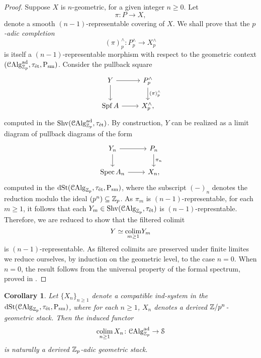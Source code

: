 \documentclass[10pt,a4paper]{amsart}
\numberwithin{equation}{subsection}
\newtheorem{corollary}[theorem]{Corollary}
\theoremstyle{definition}
\begin{document}
\begin{proof} Suppose $X$ is $n$-geometric, for a given integer $n \geq 0$. Let
        \[
                \pi \colon P \to X  ,
        \]
    denote a smooth $(n-1)$-representable covering of $X$. We shall prove that the \emph{$p$-adic completion}
    \[
            (\pi)^\wedge_p \colon P^\wedge_p \to X^\wedge_p    
    \] 
    is itself a $(n-1)$-representable morphism with respect to the geometric context $(\mathcal C \mathrm{Alg}^{\mathrm{ad}}_{\mathbb Z_p}, \tau_{\text{\'et}}, \mathrm P_{\mathrm{sm}})$. Consider the pullback square
        \[
        \begin{tikzcd}
                Y \ar{r} \ar{d} & P^\wedge_p \ar{d}{(\pi)^\wedge_p} \\
                \Spf A \ar{r} & X^\wedge_p,
        \end{tikzcd}
        \]
    computed in the \infcat $\mathrm{Shv}(\mathcal C \mathrm{Alg}^{\mathrm{ad}}_{\mathbb Z_p}, \tau_{\text{\'et}})$. By construction, $Y$ can be realized as a limit diagram of pullback diagrams of the form
        \[
        \begin{tikzcd} 
            Y_n \ar{r} \ar{d} & P_n \ar{d}{\pi_n} \\
            \Spec A_n \ar{r} & X_n,
        \end{tikzcd}    
        \]
    computed in the \infcat $\mathrm{dSt}(\mathcal{C}\mathrm{Alg}_{\mathbb Z_p}, \tau_{\text{\'et}}, \mathrm P_{\mathrm{sm}})$, where the subscript $(-)_n$ denotes the reduction modulo the ideal $(p^n) \subseteq \mathbb Z_p$. As $\pi_m$ is $(n-1)$-representable, for each $m \geq 1$, it follows that each
    $Y_m \in \mathrm{Shv}(\mathcal{C}\mathrm{Alg}_{\mathbb Z_p}, \tau_{\text{\'et}})$ is $(n-1)$-represntable. Therefore, we are reduced to show that the filtered colimit
        \[
            Y \simeq \underset{m \geq 1}{\operatorname*{colim}} Y_m  
        \]
    is $(n-1)$-representable. As filtered colimits are preserved under finite limites we reduce ourselves, by induction on the geometric level, to the case $n= 0$. When $n=0$, the result follows from the universal property of the formal spectrum,
    proved in \cite[Proposition 8.1.2.1]{lurie2016spectral}.
\end{proof}

\begin{corollary} \label{cor_adic_geom_stacks}
    Let $\{X_n \}_{n \geq 1}$ denote a compatible \emph{ind-system} in the \infcat $\mathrm{dSt}(\mathcal{C}\mathrm{Alg}_{\mathbb Z_p}, \tau_{\text{\'et}}, \mathrm P_{\mathrm{sm}})$, where for each $n \geq 1$,
    $X_n$ denotes a derived $\mathbb Z/p^n$-geometric stack. Then the induced functor
    \[
        \operatorname*{colim}_{n \geq 1} X_n \colon \mathcal C \mathrm{Alg}^{\mathrm{ad}}_{\mathbb Z_p} \to \mathcal S  
    \]
is naturally a derived $\mathbb Z_p$-adic geometric stack.
\end{corollary}
\end{document}
